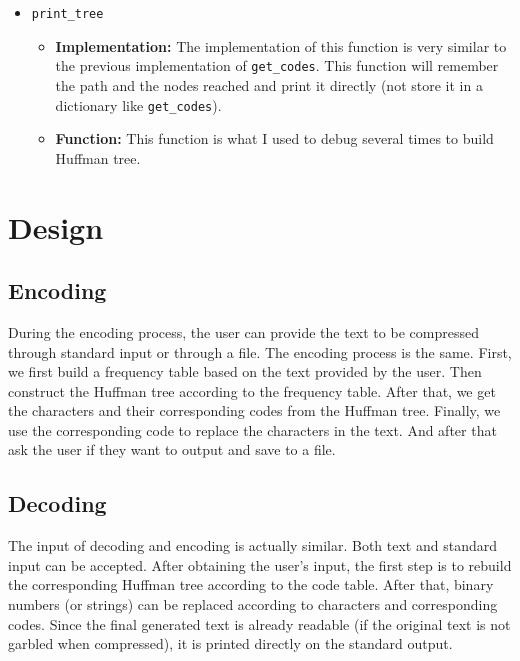 \documentclass{article}
\begin{document}
\begin{itemize}
    \item \texttt{print\_tree}
        \begin {itemize}
            \item \textbf{Implementation:} The implementation of this function is very similar to the previous implementation of \texttt{get\_codes}. This function will remember the path and the nodes reached and print it directly (not store it in a dictionary like \texttt{get\_codes}).
            \item \textbf{Function:} This function is what I used to debug several times to build Huffman tree.
        \end{itemize}
\end{itemize}

\section{Design}
    \subsection{Encoding}
        During the encoding process, the user can provide the text to be compressed through standard input or through a file. The encoding process is the same. First, we first build a frequency table based on the text provided by the user. Then construct the Huffman tree according to the frequency table. After that, we get the characters and their corresponding codes from the Huffman tree. Finally, we use the corresponding code to replace the characters in the text. And after that ask the user if they want to output and save to a file.
    \subsection{Decoding}
        The input of decoding and encoding is actually similar. Both text and standard input can be accepted. After obtaining the user's input, the first step is to rebuild the corresponding Huffman tree according to the code table. After that, binary numbers (or strings) can be replaced according to characters and corresponding codes. Since the final generated text is already readable (if the original text is not garbled when compressed), it is printed directly on the standard output.
\end{document}

